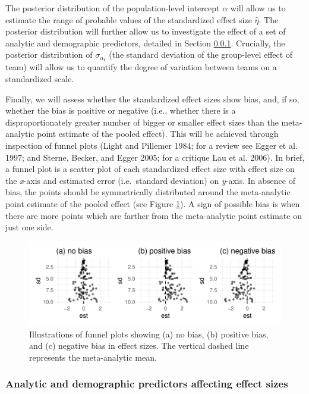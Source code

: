 \documentclass[
  12pt,
]{article}
\begin{document}
The posterior distribution of the population-level intercept \(\alpha\) will allow us to estimate the range of probable values of the standardized effect size \(\hat{\eta}\).
The posterior distribution will further allow us to investigate the effect of a set of analytic and demographic predictors, detailed in Section \ref{ana-factors}.
Crucially, the posterior distribution of \(\sigma_{\alpha_{\text{t}}}\) (the standard deviation of the group-level effect of team) will allow us to quantify the degree of variation between teams on a standardized scale.

Finally, we will assess whether the standardized effect sizes show bias, and, if so, whether the bias is positive or negative (i.e., whether there is a disproportionately greater number of bigger or smaller effect sizes than the meta-analytic point estimate of the pooled effect).
This will be achieved through inspection of funnel plots (Light and Pillemer 1984; for a review see Egger et al. 1997; and Sterne, Becker, and Egger 2005; for a critique Lau et al. 2006).
In brief, a funnel plot is a scatter plot of each standardized effect size with effect size on the \emph{x}-axis and estimated error (i.e.~standard deviation) on \emph{y}-axis.
In absence of bias, the points should be symmetrically distributed around the meta-analytic point estimate of the pooled effect (see Figure \ref{fig:funnel-plot}).
A sign of possible bias is when there are more points which are farther from the meta-analytic point estimate on just one side.

\begin{figure}
\centering
\includegraphics{Draft_RR_files/figure-latex/funnel-plot-1.pdf}
\caption{\label{fig:funnel-plot}Illustrations of funnel plots showing (a) no bias, (b) positive bias, and (c) negative bias in effect sizes. The vertical dashed line represents the meta-analytic mean.}
\end{figure}

\hypertarget{ana-factors}{%
\subsubsection{Analytic and demographic predictors affecting effect sizes}\label{ana-factors}}
\end{document}
